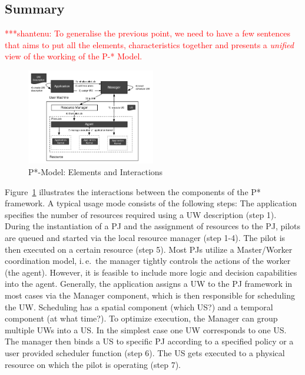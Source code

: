 \documentclass[conference,final]{IEEEtran}
\newcommand{\jhanote}[1]{ {\textcolor{red} { ***shantenu: #1 }}}
\newcommand{\jhanote}[1]{}
\begin{document}


\subsection*{Summary}

\jhanote{To generalise the previous point, we need to have a few
  sentences that aims to put all the elements, characteristics
  together and presents a {\it unified} view of the working of the P-*
  Model.}
 

\begin{figure}[htbp]
    \centering    
    \includegraphics[width=0.5\textwidth]{figures/pstar_model.pdf}
    \caption{P*-Model: Elements and Interactions}
    \label{fig:figures_pstar}
\end{figure}

Figure~\ref{fig:figures_pstar} illustrates the interactions between the
components of the P* framework. A typical usage mode consists of the following
steps: The application specifies the number of resources required using a UW
description (step 1). During the instantiation of a PJ and the assignment of
resources to the PJ, pilots are queued and started via the local resource
manager (step 1-4). The pilot is then executed on a certain resource (step 5).
Most PJs utilize a Master/Worker coordination model, i.\,e.\ the manager tightly
controls the actions of the worker (the agent). However, it is feasible to
include more logic and decision capabilities into the agent. Generally, the
application assigns a UW to the PJ framework in most cases via the Manager
component, which is then responsible for scheduling the UW. Scheduling has a
spatial component (which US?) and a temporal component (at what time?). To
optimize execution, the Manager can group multiple UWs into a US. In the
simplest case one UW corresponds to one US. The manager then binds a US to
specific PJ according to a specified policy or a user provided scheduler
function (step 6). The US gets executed to a physical resource on which the
pilot is operating (step 7).
\end{document}
